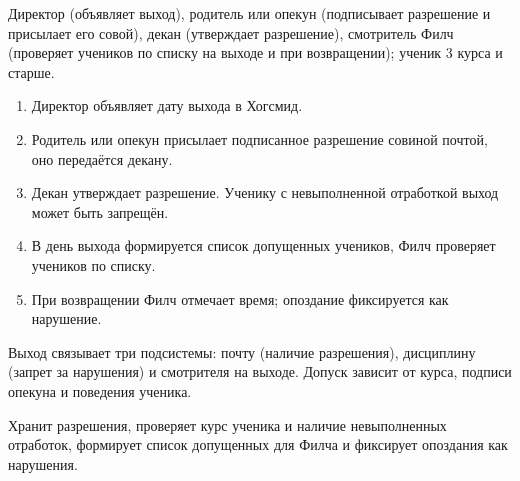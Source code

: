 \documentclass[a4paper,12pt]{article}
\begin{document}
\begin{description}[leftmargin=0pt,labelindent=0pt,style=nextline]
\item[Участники] Директор (объявляет выход), родитель или опекун (подписывает
  разрешение и присылает его совой), декан (утверждает разрешение), смотритель Филч
  (проверяет учеников по списку на выходе и при возвращении); ученик 3 курса и старше.
\item[Ход процесса]\leavevmode
  \begin{enumerate}
    \item Директор объявляет дату выхода в Хогсмид.
    \item Родитель или опекун присылает подписанное разрешение совиной почтой, оно передаётся декану.
    \item Декан утверждает разрешение. Ученику с невыполненной отработкой выход может быть запрещён.
    \item В день выхода формируется список допущенных учеников, Филч проверяет учеников по списку.
    \item При возвращении Филч отмечает время; опоздание фиксируется как нарушение.
  \end{enumerate}
\item[Особенность] Выход связывает три подсистемы: почту (наличие разрешения), дисциплину (запрет за нарушения) и смотрителя на выходе.
  Допуск зависит от курса, подписи опекуна и поведения ученика.
\item[Роль ИС] Хранит разрешения, проверяет курс ученика и наличие невыполненных
  отработок, формирует список допущенных для Филча и фиксирует опоздания как нарушения.
\end{description}
 
 
 
\end{document}
